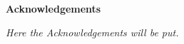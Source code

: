 \thispagestyle{empty}

\begin{center}
  {\bf \Huge Acknowledgements}
\end{center}

\vspace{4cm}

\emph{
  Here the Acknowledgements will be put.\newline
}
